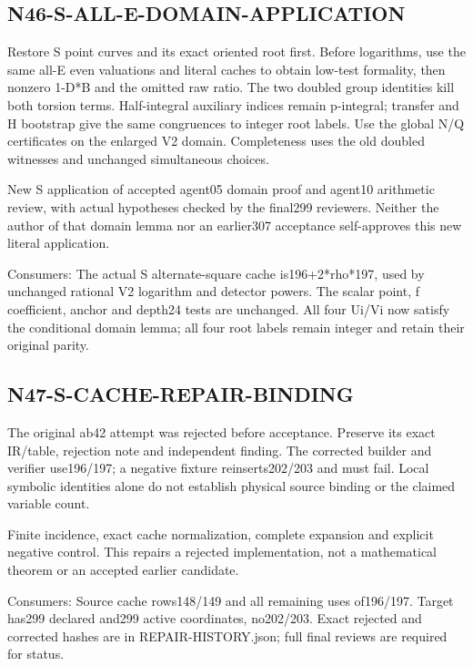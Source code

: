 \documentclass{article}
\begin{document}
\subsection{N46-S-ALL-E-DOMAIN-APPLICATION}
\label{outline:r6-n46-s-all-e-domain-application}
Restore S point curves and its exact oriented root first. Before logarithms, use the same all-E even valuations and literal caches to obtain low-test formality, then nonzero 1-D*B and the omitted raw ratio. The two doubled group identities kill both torsion terms. Half-integral auxiliary indices remain p-integral; transfer and H bootstrap give the same congruences to integer root labels. Use the global N/Q certificates on the enlarged V2 domain. Completeness uses the old doubled witnesses and unchanged simultaneous choices.
\par New S application of accepted agent05 domain proof and agent10 arithmetic review, with actual hypotheses checked by the final299 reviewers. Neither the author of that domain lemma nor an earlier307 acceptance self-approves this new literal application.
\par Consumers: The actual S alternate-square cache is196+2*rho*197, used by unchanged rational V2 logarithm and detector powers. The scalar point, f coefficient, anchor and depth24 tests are unchanged. All four Ui/Vi now satisfy the conditional domain lemma; all four root labels remain integer and retain their original parity.
\subsection{N47-S-CACHE-REPAIR-BINDING}
\label{outline:r6-n47-s-cache-repair-binding}
The original ab42 attempt was rejected before acceptance. Preserve its exact IR/table, rejection note and independent finding. The corrected builder and verifier use196/197; a negative fixture reinserts202/203 and must fail. Local symbolic identities alone do not establish physical source binding or the claimed variable count.
\par Finite incidence, exact cache normalization, complete expansion and explicit negative control. This repairs a rejected implementation, not a mathematical theorem or an accepted earlier candidate.
\par Consumers: Source cache rows148/149 and all remaining uses of196/197. Target has299 declared and299 active coordinates, no202/203. Exact rejected and corrected hashes are in REPAIR-HISTORY.json; full final reviews are required for status.
\end{document}
